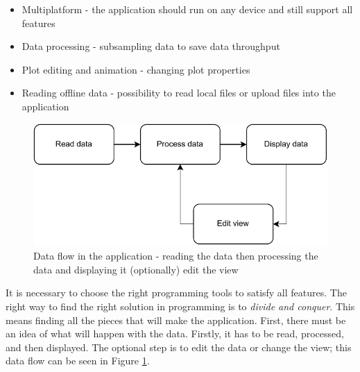 \begin{itemize}
    \item Multiplatform - the application should run on any device and still support all features
    \item Data processing - subsampling data to save data throughput
    \item Plot editing and animation - changing plot properties
    \item Reading offline data - possibility to read local files or upload files into the application
\end{itemize}


\begin{figure}[h]
    \centering
    \includegraphics{pdf/simple_application.drawio.pdf}
    \caption{Data flow in the application - reading the data then processing the data and displaying it (optionally) edit the view}
    \label{fig:dataflow}
\end{figure}

It is necessary to choose the right programming tools to satisfy all features. The right way to find the right solution in programming is to \textit{divide and conquer}. This means finding all the pieces that will make the application. First, there must be an idea of what will happen with the data. Firstly, it has to be read, processed, and then displayed. The optional step is to edit the data or change the view; this data flow can be seen in Figure \ref{fig:dataflow}. 


